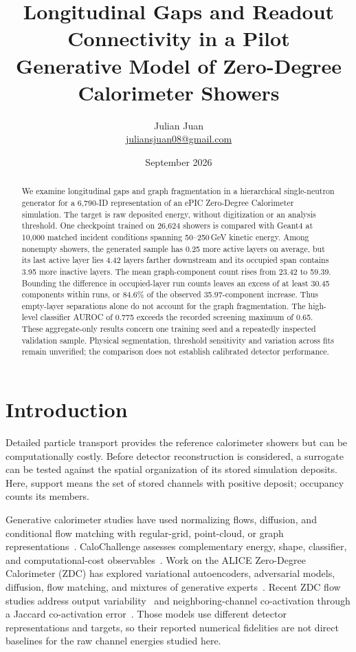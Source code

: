 \documentclass[11pt]{article}
\title{Longitudinal Gaps and Readout Connectivity in a Pilot\\Generative Model of Zero-Degree Calorimeter Showers}
\author{Julian Juan\\[3pt]\small\href{mailto:juliansjuan08@gmail.com}{juliansjuan08@gmail.com}}
\date{September 2026}
\begin{document}
\maketitle

\begin{abstract}
We examine longitudinal gaps and graph fragmentation in a hierarchical single-neutron generator for a 6,790-ID representation of an ePIC Zero-Degree Calorimeter simulation. The target is raw deposited energy, without digitization or an analysis threshold. One checkpoint trained on 26,624 showers is compared with Geant4 at 10,000 matched incident conditions spanning 50--250\,GeV kinetic energy. Among nonempty showers, the generated sample has 0.25 more active layers on average, but its last active layer lies 4.42 layers farther downstream and its occupied span contains 3.95 more inactive layers. The mean graph-component count rises from 23.42 to 59.39. Bounding the difference in occupied-layer run counts leaves an excess of at least 30.45 components within runs, or 84.6\% of the observed 35.97-component increase. Thus empty-layer separations alone do not account for the graph fragmentation. The high-level classifier AUROC of 0.775 exceeds the recorded screening maximum of 0.65. These aggregate-only results concern one training seed and a repeatedly inspected validation sample. Physical segmentation, threshold sensitivity and variation across fits remain unverified; the comparison does not establish calibrated detector performance.
\end{abstract}

\section{Introduction}

Detailed particle transport provides the reference calorimeter showers but can be computationally costly. Before detector reconstruction is considered, a surrogate can be tested against the spatial organization of its stored simulation deposits. Here, support means the set of stored channels with positive deposit; occupancy counts its members.

Generative calorimeter studies have used normalizing flows, diffusion, and conditional flow matching with regular-grid, point-cloud, or graph representations~\cite{caloflow,calodiffusion,calograph,caloclouds2,calodream}. CaloChallenge assesses complementary energy, shape, classifier, and computational-cost observables~\cite{calochallenge,kansalmetrics}. Work on the ALICE Zero-Degree Calorimeter (ZDC) has explored variational autoencoders, adversarial models, diffusion, flow matching, and mixtures of generative experts~\cite{dubinskizdc,kitazdc,fasterzdc,expertsim,wojnar2025}. Recent ZDC flow studies address output variability~\cite{majerziaf} and neighboring-channel co-activation through a Jaccard co-activation error~\cite{majerz2026}. Those models use different detector representations and targets, so their reported numerical fidelities are not direct baselines for the raw channel energies studied here.
\end{document}
